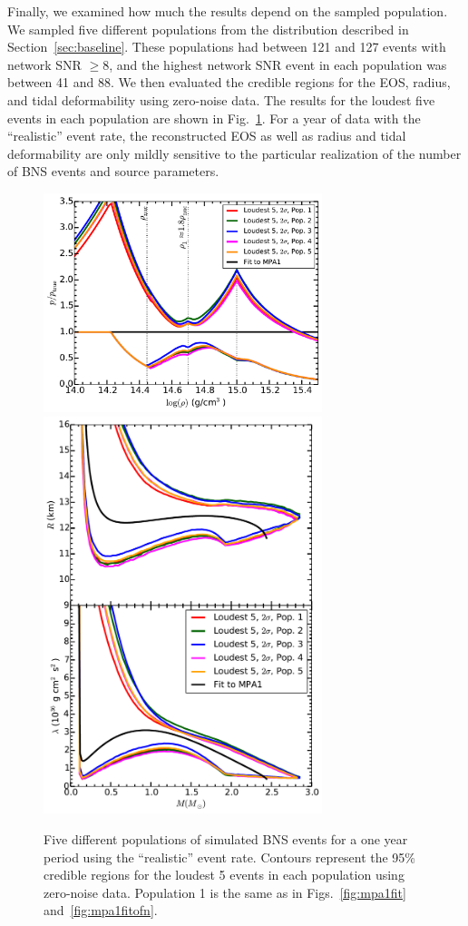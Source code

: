 \documentclass[twocolumn,prd,amssymb,aps,nofootinbib,showpacs,epsf]{revtex4}
\begin{document}
Finally, we examined how much the results depend on the sampled population. We sampled five different populations from the distribution described in Section~\ref{sec:baseline}. These populations had between 121 and 127 events with network SNR $\ge 8$, and the highest network SNR event in each population was between 41 and 88. We then evaluated the credible regions for the EOS, radius, and tidal deformability using zero-noise data. The results for the loudest five events in each population are shown in Fig.~\ref{fig:populations}. For a year of data with the ``realistic'' event rate, the reconstructed EOS as well as radius and tidal deformability are only mildly sensitive to the particular realization of the number of BNS events and source parameters.

\begin{figure}[!htb]
\begin{center}
\includegraphics[width=3.2in]{LALMCMCmpa1FitTaylorF2ComparePopperror.pdf}\\
\includegraphics[width=3.2in]{LALMCMCmpa1FitTaylorF2ComparePopRadiuslambda.pdf}\caption{Five different populations of simulated BNS events for a one year period using the ``realistic'' event rate. Contours represent the 95\% credible regions for the loudest 5 events in each population using zero-noise data. Population 1 is the same as in Figs.~\ref{fig:mpa1fit} and~\ref{fig:mpa1fitofn}.}
\label{fig:populations}
\end{center}
\end{figure}
\end{document}
